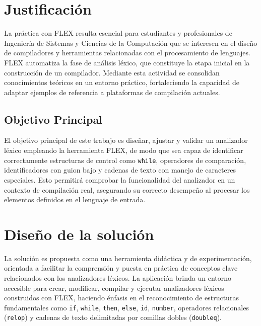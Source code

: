 \documentclass{article}
\begin{document}
\section*{Justificación}
La práctica con FLEX resulta esencial para estudiantes y profesionales de Ingeniería de Sistemas y Ciencias de la Computación que se interesen en el diseño de compiladores y herramientas relacionadas con el procesamiento de lenguajes. FLEX automatiza la fase de análisis léxico, que constituye la etapa inicial en la construcción de un compilador. Mediante esta actividad se consolidan conocimientos teóricos en un entorno práctico, fortaleciendo la capacidad de adaptar ejemplos de referencia a plataformas de compilación actuales.
\subsection{Objetivo Principal}
El objetivo principal de este trabajo es diseñar, ajustar y validar un analizador léxico empleando la herramienta FLEX, de modo que sea capaz de identificar correctamente estructuras de control como \texttt{while}, operadores de comparación, identificadores con guion bajo y cadenas de texto con manejo de caracteres especiales. Esto permitirá comprobar la funcionalidad del analizador en un contexto de compilación real, asegurando su correcto desempeño al procesar los elementos definidos en el lenguaje de entrada.


\section{Diseño de la solución}\label{sec:dis}

La solución es propuesta como una herramienta didáctica y de experimentación, orientada a facilitar la comprensión y puesta en práctica de conceptos clave relacionados con los analizadores léxicos. La aplicación brinda un entorno accesible para crear, modificar, compilar y ejecutar analizadores léxicos construidos con FLEX, haciendo énfasis en el reconocimiento de estructuras fundamentales como \texttt{if}, \texttt{while}, \texttt{then}, \texttt{else}, \texttt{id}, \texttt{number}, operadores relacionales (\texttt{relop}) y cadenas de texto delimitadas por comillas dobles (\texttt{doubleq}).
\end{document}
